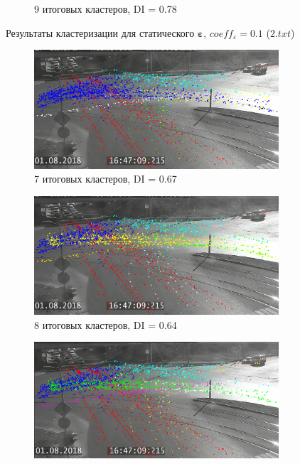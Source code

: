 \begin{figure}[!htb]
\begin{subfigure}[!htb]{0.8\textwidth}
		\caption{9 итоговых кластеров, DI = 0.78}
		\label{fig:2-9cl-01}
	\end{subfigure}
	\caption{Результаты кластеризации для статического $\bm{\varepsilon}$, $coeff_\varepsilon = 0.1$ ($2.txt$)}
	\label{fig:clust-res-2-01}
\end{figure}

\begin{figure}[!htb]
	\centering
	\begin{subfigure}[!htb]{0.8\textwidth}
		\centering{}
		\includegraphics[width=\textwidth]{images/cl-res/2-7cl-015.png}
		\caption{7 итоговых кластеров, DI = 0.67}
		\label{fig:2-7cl-015}
	\end{subfigure}
	\hfill
	\begin{subfigure}[!htb]{0.8\textwidth}
		\centering{}
		\includegraphics[width=\textwidth]{images/cl-res/2-8cl-015.png}
		\caption{8 итоговых кластеров, DI = 0.64}
		\label{fig:2-8cl-015}
	\end{subfigure}
	\hfill
	\begin{subfigure}[!htb]{0.8\textwidth}
		\centering{}
		\includegraphics[width=\textwidth]{images/cl-res/2-9cl-015.png}

\end{subfigure}
\end{figure}
